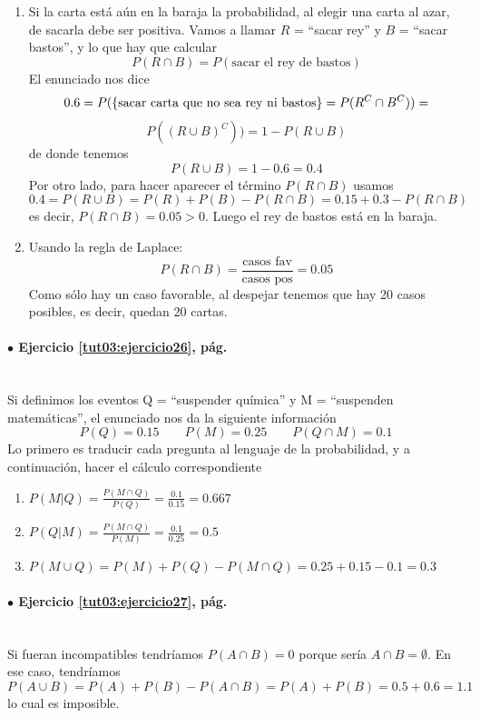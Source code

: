 \documentclass[10pt,a4paper]{article}\usepackage[]{graphicx}\usepackage[]{color}
\newcounter {cont01}
\begin{document}
\begin{enumerate}
\item Si la carta está aún en la baraja la probabilidad, al elegir una carta al  azar, de sacarla debe ser positiva. Vamos a llamar $R$ = ``sacar rey''  y $B$ = ``sacar bastos'', y lo que hay que calcular $$P(R\cap B)= 
P(\text{sacar el rey de bastos})$$
El enunciado nos dice 
$$0.6=P(\{\hbox{sacar carta que no sea rey ni bastos}\}=
P(R^C\cap B^C))=$$ 
$$P((R\cup B)^C))=1-P(R\cup B)$$
de donde tenemos 
$$P(R\cup B)=1-0.6=0.4$$
Por otro lado, para hacer aparecer el término $P(R\cap B)$ usamos 
$$0.4=P(R\cup B)=P(R)+P(B)-P(R\cap B)= 0.15+0.3-P(R\cap B)$$
es decir, $P(R\cap B)=0.05>0$. Luego el rey de bastos está en la baraja.
\item Usando la regla de Laplace: $$P(R\cap B)=\frac{\text{casos fav} }{\text{casos pos}}=0.05$$
Como sólo hay un caso favorable, al despejar tenemos que hay 20 casos posibles, es decir, quedan 20 cartas.
\end{enumerate}

\paragraph{\bf $\bullet$ Ejercicio \ref{tut03:ejercicio26}, pág. \pageref{tut03:ejercicio26}}
\label{tut03:ejercicio26:sol}\quad\\
Si definimos los eventos Q = ``suspender química'' y M = ``suspenden matemáticas'', el enunciado nos da la siguiente información
$$P(Q)=0\text{.}15\qquad P(M)=0\text{.}25\qquad P(Q\cap M)=0\text{.}1 $$
Lo primero es traducir cada pregunta al lenguaje de la probabilidad, y a continuación, hacer el cálculo correspondiente
\begin{enumerate}
\item $P(M|Q)=\frac{P(M\cap Q)}{P(Q)}=\frac{0\text{.}1}{0\text{.}15} = 0\text{.}667 $
\item $P(Q|M)=\frac{P(M\cap Q)}{P(M)}=\frac{0\text{.}1}{0\text{.}25}=0\text{.}5 $
\item $P(M\cup Q)= P(M) + P(Q) -P(M\cap Q)=0\text{.}25+0\text{.}15-0\text{.}1 =0\text{.}3 $
\end{enumerate}

\paragraph{\bf $\bullet$ Ejercicio \ref{tut03:ejercicio27}, pág. \pageref{tut03:ejercicio27}}
\label{tut03:ejercicio27:sol}\quad\\
Si fueran incompatibles tendríamos $P(A\cap B)=0$ porque sería $A\cap B=\emptyset$. En ese caso, tendríamos 
$$P(A\cup B)=P(A)+P(B)-P(A\cap B) =P(A)+P(B)=0\text{.}5+0\text{.}6=1\text{.}1$$
lo cual es imposible.
\end{document}
